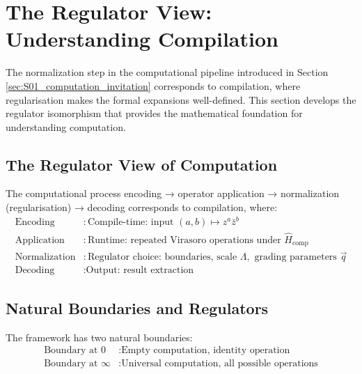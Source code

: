 
\section{The Regulator View: Understanding Compilation}
\label{sec:regulator-view}

The normalization step in the computational pipeline introduced in Section \ref{sec:S01_computation_invitation} corresponds to compilation, where regularisation makes the formal expansions well-defined. This section develops the regulator isomorphism that provides the mathematical foundation for understanding computation.

\subsection{The Regulator View of Computation}

\begin{definition}
\label{def:regulator-view}
The computational process encoding → operator application → normalization (regularisation) → decoding corresponds to compilation, where:
\begin{align}
\text{Encoding} &: \text{Compile-time: input } (a,b) \mapsto z^a \bar{z}^b \\
\text{Application} &: \text{Runtime: repeated Virasoro operations under } \hat{H}_{\text{comp}} \\
\text{Normalization} &: \text{Regulator choice: boundaries, scale } \Lambda, \text{ grading parameters } \vec{q} \\
\text{Decoding} &: \text{Output: result extraction}
\end{align}
\end{definition}

\subsection{Natural Boundaries and Regulators}

\begin{definition}
\label{def:natural-boundaries}
The framework has two natural boundaries:
\begin{align}
\text{Boundary at 0} &: \text{Empty computation, identity operation} \\
\text{Boundary at } \infty &: \text{Universal computation, all possible operations}
\end{align}
\end{definition}

